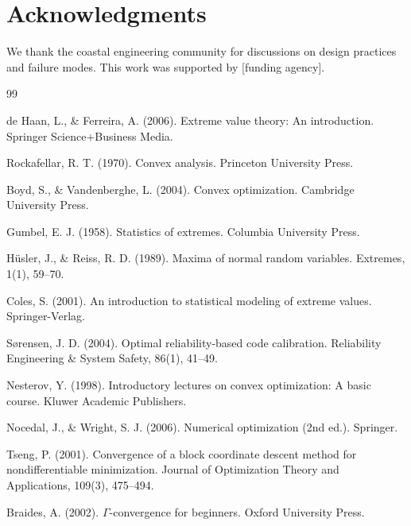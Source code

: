 \documentclass[12pt]{article}
\theoremstyle{definition}
\begin{document}
\section*{Acknowledgments}

We thank the coastal engineering community for discussions on design practices and failure modes. This work was supported by [funding agency].

\begin{thebibliography}{99}

 de Haan, L., \& Ferreira, A. (2006). Extreme value theory: An introduction. Springer Science+Business Media.

 Rockafellar, R. T. (1970). Convex analysis. Princeton University Press.

 Boyd, S., \& Vandenberghe, L. (2004). Convex optimization. Cambridge University Press.

 Gumbel, E. J. (1958). Statistics of extremes. Columbia University Press.

 Hüsler, J., \& Reiss, R. D. (1989). Maxima of normal random variables. Extremes, 1(1), 59--70.

 Coles, S. (2001). An introduction to statistical modeling of extreme values. Springer-Verlag.

 Sørensen, J. D. (2004). Optimal reliability-based code calibration. Reliability Engineering \& System Safety, 86(1), 41--49.

 Nesterov, Y. (1998). Introductory lectures on convex optimization: A basic course. Kluwer Academic Publishers.

 Nocedal, J., \& Wright, S. J. (2006). Numerical optimization (2nd ed.). Springer.

 Tseng, P. (2001). Convergence of a block coordinate descent method for nondifferentiable minimization. Journal of Optimization Theory and Applications, 109(3), 475--494.

 Braides, A. (2002). $\Gamma$-convergence for beginners. Oxford University Press.

\end{thebibliography}
\end{document}

